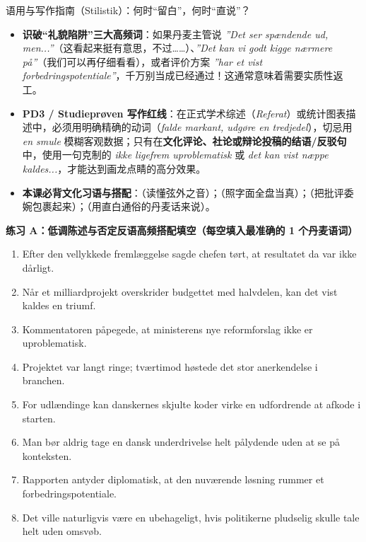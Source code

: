 \begin{grammatikbox}{语用与写作指南（Stilistik）：何时“留白”，何时“直说”？}
\begin{itemize}
  \item \textbf{识破“礼貌陷阱”三大高频词}：如果丹麦主管说 \textit{”Det ser spændende ud, men...”}（这看起来挺有意思，不过……）、\textit{”Det kan vi godt kigge nærmere på”}（我们可以再仔细看看），或者评价方案 \textit{”har et vist forbedringspotentiale”}，千万别当成已经通过！这通常意味着需要实质性返工。
  \item \textbf{PD3 / Studieprøven 写作红线}：在正式学术综述（\textit{Referat}）或统计图表描述中，必须用明确精确的动词（\textit{falde markant, udgøre en tredjedel}），切忌用 \textit{en smule} 模糊客观数据；只有在\textbf{文化评论、社论或辩论投稿的结语/反驳句}中，使用一句克制的 \textit{ikke ligefrem uproblematisk} 或 \textit{det kan vist næppe kaldes...}，才能达到画龙点睛的高分效果。
  \item \textbf{本课必背文化习语与搭配}：（读懂弦外之音）；（照字面全盘当真）；（把批评委婉包裹起来）；（用直白通俗的丹麦话来说）。
\end{itemize}
\end{grammatikbox}


\textbf{练习 A：低调陈述与否定反语高频搭配填空（每空填入最准确的 1 个丹麦语词）}
\begin{enumerate}
  \item Efter den vellykkede fremlæggelse sagde chefen tørt, at resultatet da var ikke \underline{\hspace{2.2cm}} dårligt.
  \item Når et milliardprojekt overskrider budgettet med halvdelen, kan det vist \underline{\hspace{2.2cm}} kaldes en triumf.
  \item Kommentatoren påpegede, at ministerens nye reformforslag ikke \underline{\hspace{2.2cm}} er uproblematisk.
  \item Projektet var langt \underline{\hspace{2.2cm}} ringe; tværtimod høstede det stor anerkendelse i branchen.
  \item For udlændinge kan danskernes skjulte koder virke en \underline{\hspace{2.2cm}} udfordrende at afkode i starten.
  \item Man bør aldrig tage en dansk underdrivelse helt \underline{\hspace{2.2cm}} pålydende uden at se på konteksten.
  \item Rapporten antyder diplomatisk, at den nuværende løsning rummer et \underline{\hspace{2.2cm}} forbedringspotentiale.
  \item Det ville naturligvis være en \underline{\hspace{2.2cm}} ubehageligt, hvis politikerne pludselig skulle tale helt uden omsvøb.
\end{enumerate}

